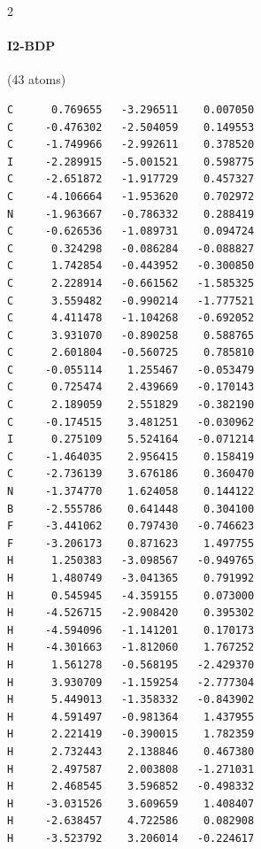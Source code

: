 \begin{multicols}{2}
\paragraph{I2-BDP} (43 atoms)
{\scriptsize\linespread{1}\selectfont\begin{verbatim}
C      0.769655   -3.296511    0.007050
C     -0.476302   -2.504059    0.149553
C     -1.749966   -2.992611    0.378520
I     -2.289915   -5.001521    0.598775
C     -2.651872   -1.917729    0.457327
C     -4.106664   -1.953620    0.702972
N     -1.963667   -0.786332    0.288419
C     -0.626536   -1.089731    0.094724
C      0.324298   -0.086284   -0.088827
C      1.742854   -0.443952   -0.300850
C      2.228914   -0.661562   -1.585325
C      3.559482   -0.990214   -1.777521
C      4.411478   -1.104268   -0.692052
C      3.931070   -0.890258    0.588765
C      2.601804   -0.560725    0.785810
C     -0.055114    1.255467   -0.053479
C      0.725474    2.439669   -0.170143
C      2.189059    2.551829   -0.382190
C     -0.174515    3.481251   -0.030962
I      0.275109    5.524164   -0.071214
C     -1.464035    2.956415    0.158419
C     -2.736139    3.676186    0.360470
N     -1.374770    1.624058    0.144122
B     -2.555786    0.641448    0.304100
F     -3.441062    0.797430   -0.746623
F     -3.206173    0.871623    1.497755
H      1.250383   -3.098567   -0.949765
H      1.480749   -3.041365    0.791992
H      0.545945   -4.359155    0.073000
H     -4.526715   -2.908420    0.395302
H     -4.594096   -1.141201    0.170173
H     -4.301663   -1.812060    1.767252
H      1.561278   -0.568195   -2.429370
H      3.930709   -1.159254   -2.777304
H      5.449013   -1.358332   -0.843902
H      4.591497   -0.981364    1.437955
H      2.221419   -0.390015    1.782359
H      2.732443    2.138846    0.467380
H      2.497587    2.003808   -1.271031
H      2.468545    3.596852   -0.498332
H     -3.031526    3.609659    1.408407
H     -2.638457    4.722586    0.082908
H     -3.523792    3.206014   -0.224617
\end{verbatim}}

\end{multicols}
